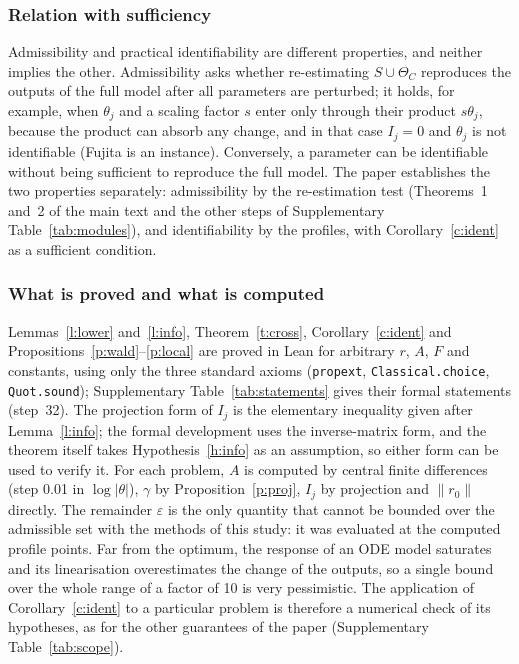 \subsubsection*{Relation with sufficiency}
Admissibility and practical identifiability are different properties, and neither implies the other. Admissibility asks whether re-estimating $S\cup\Theta_C$ reproduces the outputs of the full model after all parameters are perturbed; it holds, for example, when $\theta_j$ and a scaling factor $s$ enter only through their product $s\theta_j$, because the product can absorb any change, and in that case $I_j=0$ and $\theta_j$ is not identifiable (Fujita is an instance). Conversely, a parameter can be identifiable without being sufficient to reproduce the full model. The paper establishes the two properties separately: admissibility by the re-estimation test (Theorems~1 and~2 of the main text and the other steps of Supplementary Table~\ref{tab:modules}), and identifiability by the profiles, with Corollary~\ref{c:ident} as a sufficient condition.

\subsubsection*{What is proved and what is computed}
Lemmas~\ref{l:lower} and~\ref{l:info}, Theorem~\ref{t:cross}, Corollary~\ref{c:ident} and Propositions~\ref{p:wald}--\ref{p:local} are proved in Lean for arbitrary $r$, $A$, $F$ and constants, using only the three standard axioms (\texttt{propext}, \texttt{Classical.choice}, \texttt{Quot.sound}); Supplementary Table~\ref{tab:statements} gives their formal statements (step~32). The projection form of $I_j$ is the elementary inequality given after Lemma~\ref{l:info}; the formal development uses the inverse-matrix form, and the theorem itself takes Hypothesis~\ref{h:info} as an assumption, so either form can be used to verify it. For each problem, $A$ is computed by central finite differences (step 0.01 in $\log|\theta|$), $\gamma$ by Proposition~\ref{p:proj}, $I_j$ by projection and $\|r_0\|$ directly. The remainder $\varepsilon$ is the only quantity that cannot be bounded over the admissible set with the methods of this study: it was evaluated at the computed profile points. Far from the optimum, the response of an ODE model saturates and its linearisation overestimates the change of the outputs, so a single bound over the whole range of a factor of 10 is very pessimistic. The application of Corollary~\ref{c:ident} to a particular problem is therefore a numerical check of its hypotheses, as for the other guarantees of the paper (Supplementary Table~\ref{tab:scope}).

